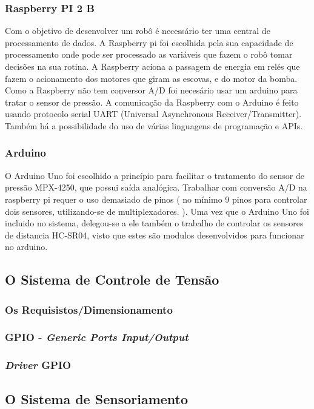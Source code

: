 \subsubsection{Raspberry PI 2 B}
Com o objetivo de desenvolver um robô é necessário ter uma central de processamento de dados. A Raspberry pi foi escolhida pela sua capacidade de processamento onde pode ser processado as variáveis que fazem o robô tomar decisões na sua rotina. A Raspberry aciona a passagem de energia em  relés que fazem o acionamento dos motores que giram as escovas, e do motor da bomba. Como a Raspberry não tem conversor A/D foi necesário usar um arduino para tratar o sensor de pressão. A comunicação da Raspberry com o Arduino é feito usando protocolo serial  UART (Universal Asynchronous Receiver/Transmitter). Também há a possibilidade do uso de várias linguagens de programação e APIs.

\subsubsection{Arduino}
O Arduino Uno foi escolhido a princípio para facilitar o tratamento do sensor de pressão MPX-4250, que possui saída analógica. Trabalhar com   conversão A/D na raspberry pi requer o uso demasiado de pinos ( no mínimo 9 pinos para controlar dois sensores, utilizando-se de multiplexadores. ).  Uma vez que o Arduino Uno foi incluido no sistema, delegou-se  a ele também o trabalho de controlar os sensores de distancia HC-SR04, visto  que  estes são modulos desenvolvidos para funcionar no arduino.
    \subsection{O Sistema de Controle de Tensão}
      \subsubsection{Os Requisistos/Dimensionamento}
      \subsubsection{GPIO - \textit{Generic Ports Input/Output}}
      \subsubsection{\textit{Driver} GPIO}
    \subsection{O Sistema de Sensoriamento}
